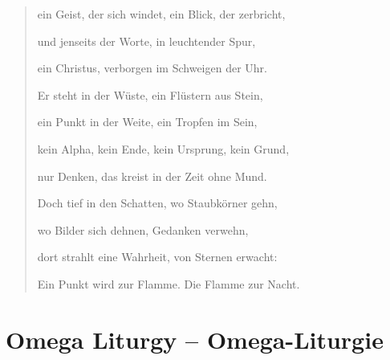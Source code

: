 \documentclass[
  ngerman,
]{article}
\begin{document}
\begin{quote}
ein Geist, der sich windet, ein Blick, der zerbricht,

und jenseits der Worte, in leuchtender Spur,

ein Christus, verborgen im Schweigen der Uhr.

Er steht in der Wüste, ein Flüstern aus Stein,

ein Punkt in der Weite, ein Tropfen im Sein,

kein Alpha, kein Ende, kein Ursprung, kein Grund,

nur Denken, das kreist in der Zeit ohne Mund.

Doch tief in den Schatten, wo Staubkörner gehn,

wo Bilder sich dehnen, Gedanken verwehn,

dort strahlt eine Wahrheit, von Sternen erwacht:

Ein Punkt wird zur Flamme. Die Flamme zur Nacht.
\end{quote}

\section{\texorpdfstring{\textbf{Omega Liturgy --
Omega-Liturgie}}{Omega Liturgy -- Omega-Liturgie}}\label{omega-liturgy-omega-liturgie}
\end{document}
